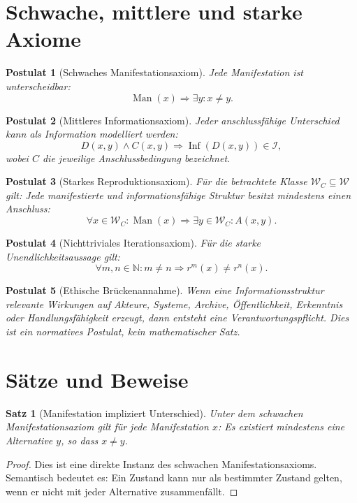\documentclass[11pt,a4paper]{article}
\newtheorem{postulat}{Postulat}[section]
\newtheorem{satz}{Satz}[section]
\theoremstyle{remark}
\newcommand{\W}{\mathcal{W}}
\newcommand{\I}{\mathcal{I}}
\newcommand{\Inf}{\operatorname{Inf}}
\newcommand{\Man}{\operatorname{Man}}
\begin{document}
\section{Schwache, mittlere und starke Axiome}

\begin{postulat}[Schwaches Manifestationsaxiom]
Jede Manifestation ist unterscheidbar:
\[
\Man(x)\Rightarrow \exists y: x\neq y.
\]
\end{postulat}

\begin{postulat}[Mittleres Informationsaxiom]
Jeder anschlussfähige Unterschied kann als Information modelliert werden:
\[
D(x,y)\land C(x,y)\Rightarrow \Inf(D(x,y))\in\I,
\]
wobei $C$ die jeweilige Anschlussbedingung bezeichnet.
\end{postulat}

\begin{postulat}[Starkes Reproduktionsaxiom]
Für die betrachtete Klasse $\W_C\subseteq\W$ gilt: Jede manifestierte und informationsfähige Struktur besitzt mindestens einen Anschluss:
\[
\forall x\in\W_C:\Man(x)\Rightarrow \exists y\in\W_C:A(x,y).
\]
\end{postulat}

\begin{postulat}[Nichttriviales Iterationsaxiom]
Für die starke Unendlichkeitsaussage gilt:
\[
\forall m,n\in\mathbb{N}:m\neq n\Rightarrow r^m(x)\neq r^n(x).
\]
\end{postulat}

\begin{postulat}[Ethische Brückenannahme]
Wenn eine Informationsstruktur relevante Wirkungen auf Akteure, Systeme, Archive, Öffentlichkeit, Erkenntnis oder Handlungsfähigkeit erzeugt, dann entsteht eine Verantwortungspflicht. Dies ist ein normatives Postulat, kein mathematischer Satz.
\end{postulat}

\section{Sätze und Beweise}

\begin{satz}[Manifestation impliziert Unterschied]
Unter dem schwachen Manifestationsaxiom gilt für jede Manifestation $x$: Es existiert mindestens eine Alternative $y$, so dass $x\neq y$.
\end{satz}
\begin{proof}
Dies ist eine direkte Instanz des schwachen Manifestationsaxioms. Semantisch bedeutet es: Ein Zustand kann nur als bestimmter Zustand gelten, wenn er nicht mit jeder Alternative zusammenfällt.
\end{proof}
\end{document}
